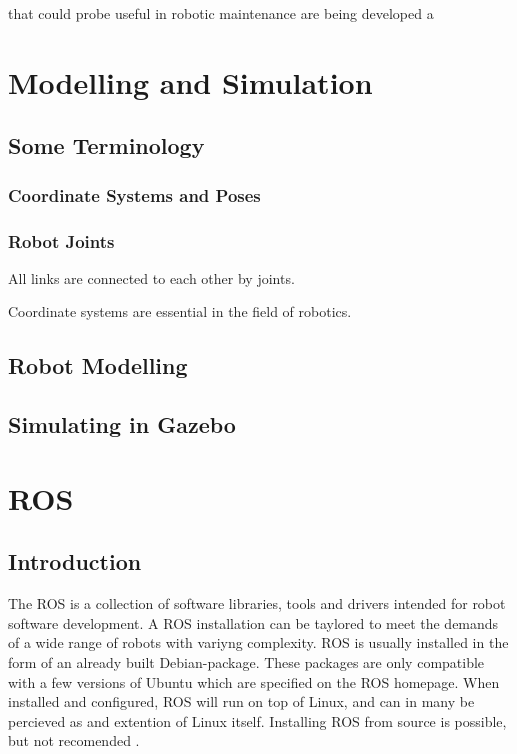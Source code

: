  that could probe useful in robotic maintenance are being developed a

\section{Modelling and Simulation}

\subsection{Some Terminology}

\subsubsection{Coordinate Systems and Poses}

\subsubsection{Robot Joints}

All links are connected to each other by joints. 

Coordinate systems are essential in the field of robotics. 

\subsection{Robot Modelling}

\subsection{Simulating in Gazebo}

\section{ROS}

\subsection{Introduction}

The \ac{ROS} is a collection of software libraries, tools and drivers intended for robot software development. A \ac{ROS} installation can be taylored to meet the demands of a wide range of robots with variyng complexity. \ac{ROS} is usually installed in the form of an already built Debian-package. These packages are only compatible with a few versions of Ubuntu which are specified on the \ac{ROS} homepage. When installed and configured, \ac{ROS} will run on top of Linux, and can in many be percieved as and extention of Linux itself. Installing \ac{ROS} from source is possible, but not recomended \cite{ROS_install}.

